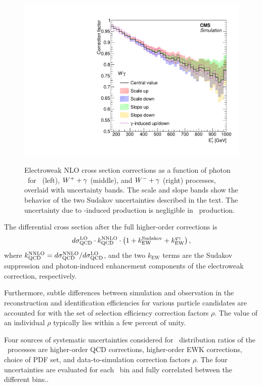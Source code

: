 \begin{figure}[htbp]
{    \includegraphics[]{Analysis/Figures/ewkcorr/wgminus.pdf}
  }
  \caption{
    Electroweak NLO cross section corrections as a function of photon \pt\ for \zinvg\ (left), ${W}^{+}+\gamma$ (middle), and ${W}^{-}+\gamma$ (right) processes, overlaid with uncertainty bands. 
    The scale and slope bands show the behavior of the two Sudakov uncertainties described in the text.
    The uncertainty due to \Pgg-induced production is negligible in \zinvg\ production.
  }
  \label{fig:ewk_correction}
\end{figure}

The differential cross section after the full higher-order corrections is
\begin{equation}
  d\sigma^{\text{LO}}_{\text{QCD}} \cdot k^{\text{NNLO}}_{\text{QCD}} \cdot \left(1 + k_{\text{EW}}^{\text{Sudakov}} + k_{\text{EW}}^{{q}\gamma} \right),
\end{equation}
where $k^{\text{NNLO}}_{\text{QCD}} = d\sigma^{\text{NNLO}}_{\text{QCD}} / d\sigma^{\text{LO}}_{\text{QCD}}$, and the two $k_{\text{EW}}$ terms are the Sudakov suppression and photon-induced enhancement components of the electroweak correction, respectively.

Furthermore, subtle differences between simulation and observation in the reconstruction and identification efficiencies for various particle candidates are accounted for with the set of selection efficiency correction factors $\rho$. 
The value of an individual $\rho$ typically lies within a few percent of unity. 

Four sources of systematic uncertainties considered for \ETg\ distribution ratios of the \vg\ processes are higher-order QCD corrections, higher-order EWK corrections, choice of PDF set, and data-to-simulation correction factors $\rho$. 
The four uncertainties are evaluated for each \ETg\ bin and fully correlated between the different bins.. 

